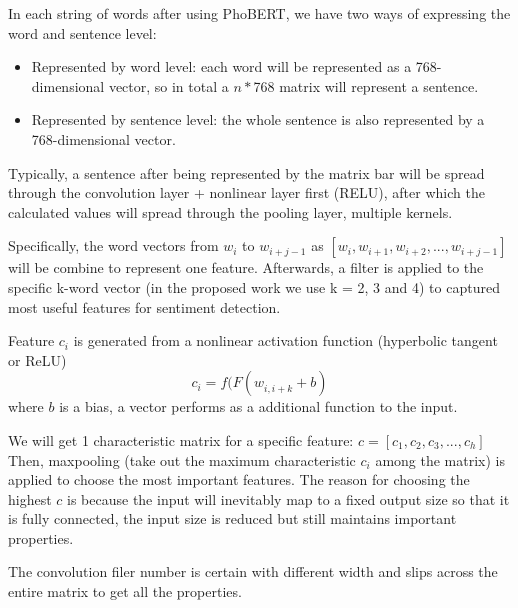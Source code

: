 In each string of words after using PhoBERT, we have two ways of expressing the word and sentence level:
\begin{itemize}
    \item Represented by word level: each word will be represented as a 768-dimensional vector, so in total a \(n*\)768 matrix will represent a sentence.
    \item Represented by sentence level: the whole sentence is also represented by a 768-dimensional vector.
\end{itemize}

Typically, a sentence after being represented by the matrix bar will be spread through the convolution layer + nonlinear layer first (RELU), after which the calculated values will spread through the pooling layer, multiple kernels.

Specifically, the word vectors from $w_{i}$ to $w_{i+j-1}$ as $[w_{i}, w_{i+1}, w_{i+2},...,w_{i+j-1}]$ will be combine to represent one feature. Afterwards, a filter is applied to the specific k-word vector (in the proposed work we use k = 2, 3 and 4) to captured most useful features for sentiment detection. 

Feature $c_{i}$ is generated from a nonlinear activation function (hyperbolic tangent or ReLU)
\begin{equation}
    c_{i} = f(F(w_{i,i+k}^{}+b)
\end{equation}
where $b$ is a bias, a vector performs as a additional function to the input.

We will get 1 characteristic matrix for a specific feature:
$c = [c_{1}, c_{2}, c_{3},...,c_{h}]$
Then, maxpooling (take out the maximum characteristic $c_{i}$ among the matrix) is applied to choose the most important features. The reason for choosing the highest $c$ is because the input will inevitably map to a fixed output size so that it is fully connected, the input size is reduced but still maintains important properties. 

The convolution filer number is certain with different width and slips across the entire matrix to get all the properties.


